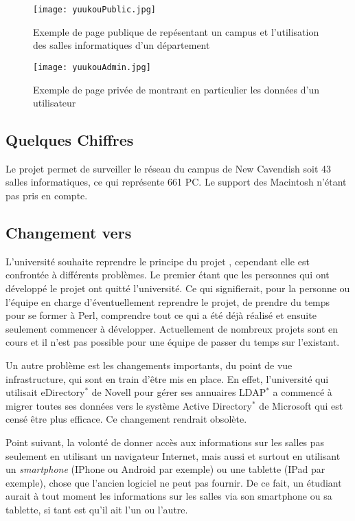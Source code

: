 \begin{figure}[!ht]
	\centering
	\texttt{[image: yuukouPublic.jpg]}
	\caption{Exemple de page publique de \Yuukou{} rep\'esentant un campus et l'utilisation des salles informatiques d'un d\'epartement}
	\label{figure:yuukouPublic}

\end{figure}

\begin{figure}[!ht]
	\centering
	\texttt{[image: yuukouAdmin.jpg]}
	\caption{Exemple de page priv\'ee de \Yuukou{} montrant en particulier les donn\'ees d'un utilisateur}
	\label{figure:yuukouAdmin}

\end{figure}

\subsection{Quelques Chiffres}

Le projet \Yuukou{} permet de surveiller le r\'eseau du campus de New Cavendish soit 43 salles informatiques, ce qui repr\'esente 661 PC. 
Le support des Macintosh n'\'etant pas pris en compte.

\subsection{Changement vers \YuukouII}

L'universit\'e souhaite reprendre le principe du projet \Yuukou, cependant elle est confront\'ee \`a diff\'erents probl\`emes.
Le premier \'etant que les personnes qui ont d\'evelopp\'e le projet ont quitt\'e l'universit\'e. 
Ce qui signifierait, pour la personne ou l'\'equipe en charge d'\'eventuellement reprendre le projet, de prendre du temps pour se former \`a Perl, comprendre tout ce qui a \'et\'e d\'ej\`a r\'ealis\'e et ensuite seulement commencer \`a d\'evelopper.
Actuellement de nombreux projets sont en cours et il n'est pas possible pour une \'equipe de passer du temps sur l'existant.

Un autre probl\`eme est les changements importants, du point de vue infrastructure, qui sont en train d'\^etre mis en place.
En effet, l'universit\'e qui utilisait eDirectory$^*$ de Novell pour g\'erer ses annuaires LDAP$^*$ a commenc\'e \`a migrer toutes ses donn\'ees vers le syst\`eme Active Directory$^*$ de Microsoft qui est cens\'e \^etre plus efficace. Ce changement rendrait \Yuukou{} obsol\`ete.

Point suivant, la volont\'e de donner acc\`es aux informations sur les salles pas seulement en utilisant un navigateur Internet, mais aussi et surtout en utilisant un \textit{smartphone} (IPhone ou Android par exemple) ou une tablette (IPad par exemple), chose que l'ancien logiciel ne peut pas fournir.
De ce fait, un \'etudiant aurait \`a tout moment les informations sur les salles via son smartphone ou sa tablette, si tant est qu'il ait l'un ou l'autre.

